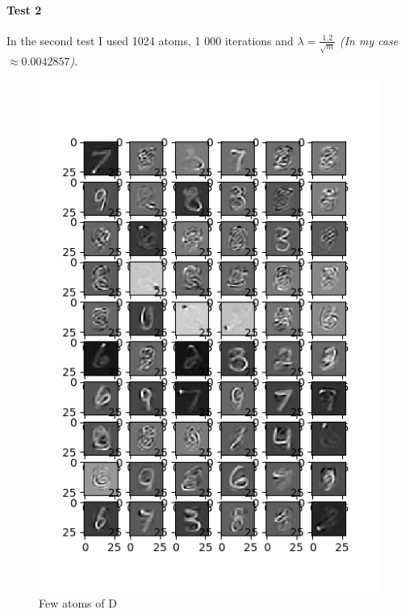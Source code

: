 \documentclass[a4paper,10pt]{article}
\begin{document}
\paragraph{Test 2}In the second test I used 1024 atoms, 1 000 iterations and $\lambda = \frac{1.2}{\sqrt{m}}$ \cite{Mairal:2009:ODL:1553374.1553463} \textit{(In my case $\approx 0.0042857$)}.
\begin{figure}[h]
 \centering
 \includegraphics[scale=0.82]{Results/SPAMS_X_ALL_K1024/D.png}
 \caption{Few atoms of D}
\end{figure}
\end{document}
